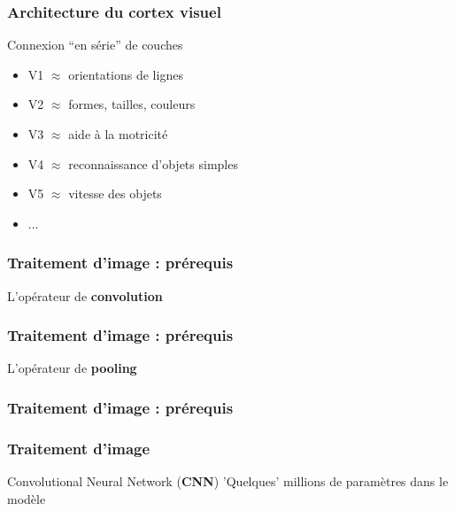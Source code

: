 \begin{frame}
  \frametitle{Architecture du cortex visuel}
  \begin{minipage}[l]{0.55\linewidth}
  \end{minipage}\hfill
  \begin{minipage}[l]{0.44\linewidth}
    Connexion ``en série'' de couches
    \begin{itemize}
    \item V1 $\approx$ orientations de lignes
    \item V2 $\approx$ formes, tailles, couleurs
    \item V3 $\approx$ aide à la motricité
    \item V4 $\approx$ reconnaissance d'objets simples
    \item V5 $\approx$ vitesse des objets
    \item ...
    \end{itemize}
  \end{minipage}\hfill
\end{frame}

\begin{frame}
  \frametitle{Traitement d'image : prérequis}
  L'opérateur de \textbf{convolution}
\end{frame}

\begin{frame}
  \frametitle{Traitement d'image : prérequis}
  L'opérateur de \textbf{pooling}
\end{frame}

\begin{frame}
  \frametitle{Traitement d'image : prérequis}
\end{frame}

\begin{frame}
  \frametitle{Traitement d'image}
  Convolutional Neural Network (\textbf{CNN})
  'Quelques' millions de paramètres dans le modèle
\end{frame}
